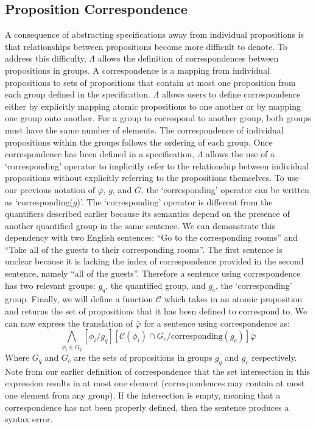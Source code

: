 \subsection{Proposition Correspondence} 
A consequence of abstracting specifications away from individual propositions is that relationships between propositions become more difficult to denote. 
To address this difficulty, $\Lambda$ allows the definition of correspondences between propositions in groups. 
A correspondence is a mapping from individual propositions to sets of propositions that contain at most one proposition from each group defined in the specification. 
$\Lambda$ allows users to define correspondence either by explicitly mapping atomic propositions to one another or by mapping one group onto another. 
For a group to correspond to another group, both groups must have the same number of elements. 
The correspondence of individual propositions within the groups follows the ordering of each group. 
Once correspondence has been defined in a specification, $\Lambda$ allows the use of a `corresponding' operator to implicitly refer to the relationship between individual propositions without explicitly referring to the propositions themselves. 
To use our previous notation of $\bar{\varphi}$, $g$, and $G$, the `corresponding' operator can be written as `corresponding($g$)'. 
The `corresponding' operator is different from the quantifiers described earlier because its semantics depend on the presence of another quantified group in the same sentence. 
We can demonstrate this dependency with two English sentences: ``Go to the corresponding rooms'' and ``Take all of the guests to their corresponding rooms''.
The first sentence is unclear because it is lacking the index of correspondence provided in the second sentence, namely ``all of the guests''. 
Therefore a sentence using correspondence has two relevant groups: $g_q$, the quantified group, and $g_c$, the `corresponding' group. 
Finally, we will define a function $\mathcal{C}$ which takes in an atomic proposition and returns the set of propositions that it has been defined to correspond to. 
We can now express the translation of $\bar{\varphi}$ for a sentence using correspondence as:
\begin{equation*}
	\bigwedge \limits_{\phi_i \in G_q} [\phi_i / g_q] [\mathcal{C}(\phi_i) \cap G_c / \text{corresponding}(g_c)] \bar{\varphi}
\end{equation*}
Where $G_q$ and $G_c$ are the sets of propositions in groups $g_q$ and $g_c$ respectively. 
Note from our earlier definition of correspondence that the set intersection in this expression results in at most one element (correspondences may contain at most one element from any group). 
If the intersection is empty, meaning that a correspondence has not been properly defined, then the sentence produces a syntax error. 


